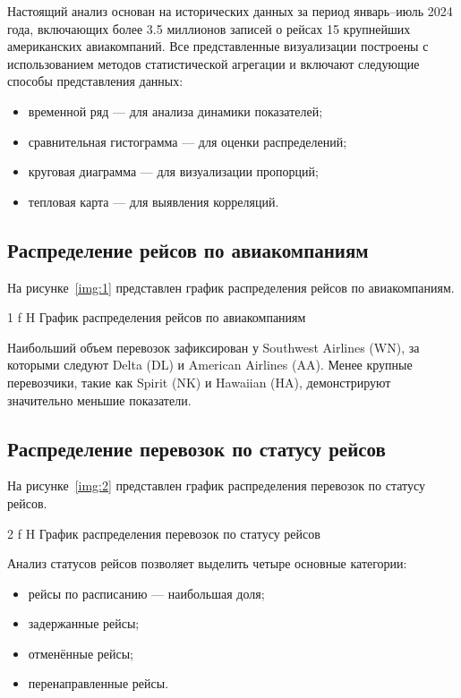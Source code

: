 Настоящий анализ основан на исторических данных за период январь--июль 2024 года, включающих более 3.5 миллионов записей о рейсах 15 крупнейших американских авиакомпаний.
Все представленные визуализации построены с использованием методов статистической агрегации и включают следующие способы представления данных:
\begin{itemize}[label=---]
    \item временной ряд --- для анализа динамики показателей;
    \item сравнительная гистограмма --- для оценки распределений;
    \item круговая диаграмма --- для визуализации пропорций;
    \item тепловая карта --- для выявления корреляций.
\end{itemize}


\subsection{Распределение рейсов по авиакомпаниям}

На рисунке~\ref{img:1} представлен график распределения рейсов по авиакомпаниям.

{1}
{f}
{H}
{\textwidth}
{График распределения рейсов по авиакомпаниям}

Наибольший объем перевозок зафиксирован у Southwest Airlines (WN), за которыми следуют Delta (DL) и American Airlines (AA).
Менее крупные перевозчики, такие как Spirit (NK) и Hawaiian (HA), демонстрируют значительно меньшие показатели.

\subsection{Распределение перевозок по статусу рейсов}

На рисунке~\ref{img:2} представлен график распределения перевозок по статусу рейсов.

{2}
{f}
{H}
{\textwidth}
{График распределения перевозок по статусу рейсов}

Анализ статусов рейсов позволяет выделить четыре основные категории:
\begin{itemize}[label=---]
    \item рейсы по расписанию --- наибольшая доля;
    \item задержанные рейсы;
    \item отменённые рейсы;
    \item перенаправленные рейсы.
\end{itemize}

